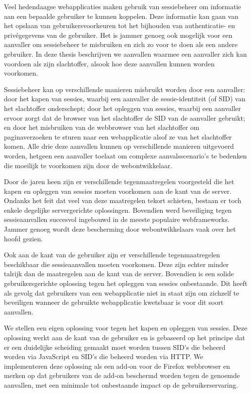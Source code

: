 \documentclass[master=cws,english]{kulemt}
\begin{document}
\begin{abstract*}
Veel hedendaagse webapplicaties maken gebruik van sessiebeheer om informatie aan een bepaalde gebruiker te kunnen koppelen. Deze informatie kan gaan van het opslaan van gebruikersvoorkeuren tot het bijhouden van authenticatie- en priv\'egegevens van de gebruiker. Het is jammer genoeg ook mogelijk voor een aanvaller om sessiebeheer te misbruiken en zich zo voor te doen als een andere gebruiker. In deze thesis beschrijven we aanvallen waarmee een aanvaller zich kan voordoen als zijn slachtoffer, alsook hoe deze aanvallen kunnen worden voorkomen.

Sessiebeheer kan op verschillende manieren misbruikt worden door een aanvaller: door het kapen van sessies, waarbij een aanvaller de sessie-identiteit (of SID) van het slachtoffer onderschept; door het opleggen van sessies, waarbij een aanvaller ervoor zorgt dat de browser van het slachtoffer de SID van de aanvaller gebruikt; en door het misbruiken van de webbrowser van het slachtoffer om paginaverzoeken te sturen naar een webapplicatie alsof ze van het slachtoffer komen. Alle drie deze aanvallen kunnen op verschillende manieren uitgevoerd worden, hetgeen een aanvaller toelaat om complexe aanvalsscenario's te bedenken die moeilijk te voorkomen zijn door de webontwikkelaar.

Door de jaren heen zijn er verschillende tegenmaatregelen voorgesteld die het kapen en opleggen van sessies moeten voorkomen aan de kant van de server. Ondanks het feit dat veel van deze maatregelen tekort schieten, bestaan er toch enkele degelijke servergerichte oplossingen. Bovendien werd beveiliging tegen sessieaanvallen succesvol ingebouwd in de meeste populaire webframeworks. Jammer genoeg wordt deze bescherming door webontwikkelaars vaak over het hoofd gezien.

Ook aan de kant van de gebruiker zijn er verschillende tegenmaatregelen beschikbaar die sessieaanvallen moeten voorkomen. Deze zijn echter minder talrijk dan de maatregelen aan de kant van de server. Bovendien is een solide gebruikersgerichte oplossing tegen het opleggen van sessies onbestaande. Dit heeft als gevolg dat gebruikers van een webapplicatie niet in staat zijn om zichzelf te beveiligen wanneer de gebruikte webapplicatie kwetsbaar is voor dit soort aanvallen.

We stellen een eigen oplossing voor tegen het kapen en opleggen van sessies. Deze oplossing werkt aan de kant van de gebruiker en is gebaseerd op het principe dat er een duidelijke scheiding gemaakt moet worden tussen SID's die beheerd worden via JavaScript en SID's die beheerd worden via HTTP. We implementeren deze oplossing als een add-on voor de Firefox webbrowser en merken op dat gebruikers van de add-on beschermd worden tegen de genoemde aanvallen, met een minimale tot onbestaande impact op de gebruikerservaring.
\end{abstract*}
\end{document}
